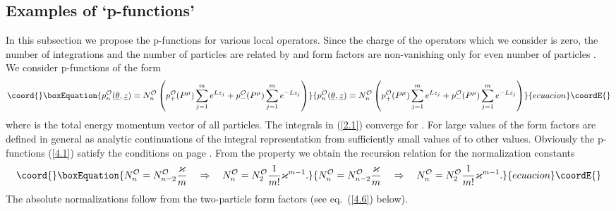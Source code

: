 \documentclass[a4paper,a4paper]{article}
\begin{document}
\subsection{Examples of `p-functions'}

\label{s41}

In this subsection we propose the p-functions for various local operators.
Since the charge of the operators which we consider is zero, the number of
integrations \coordHE{} and the number of particles \coordHE{} are related by \coordHE{} and
form factors are non-vanishing only for even number of particles \coordHE{}. We consider p-functions of the form 
\begin{equation}\coord{}\boxEquation{
p_{n}^{\mathcal{O}}(\underline{\theta },{\underline{z}})=N_{n}^{\mathcal{O}
}\left( p_{+}^{\mathcal{O}}(P^{\mu })\sum_{j=1}^{m}e^{Lz_{j}}+p_{-}^{
\mathcal{O}}(P^{\mu })\sum_{j=1}^{m}e^{-Lz_{j}}\right)  \label{4.1}
}{
p_{n}^{\mathcal{O}}(\underline{\theta },{\underline{z}})=N_{n}^{\mathcal{O}
}\left( p_{+}^{\mathcal{O}}(P^{\mu })\sum_{j=1}^{m}e^{Lz_{j}}+p_{-}^{
\mathcal{O}}(P^{\mu })\sum_{j=1}^{m}e^{-Lz_{j}}\right)  }{ecuacion}\coordE{}\end{equation}
where \coordHE{} is the total energy momentum vector of all particles. The
integrals in (\ref{2.1}) converge for \coordHE{}. For
large values of \coordHE{} the form factors are defined in general as analytic
continuations of the integral representation from sufficiently small values
of \myHighlight{$\nu $}\coordHE{} to other values. Obviously the p-functions (\ref{4.1}) satisfy the
conditions \coordHE{} on page \pageref{p}. From the
property \coordHE{} we obtain the recursion relation for the
normalization constants 
\begin{equation}\coord{}\boxEquation{
N_{n}^{\mathcal{O}}=N_{n-2}^{\mathcal{O}}\frac{\varkappa }{m}\quad
\Rightarrow \quad N_{n}^{\mathcal{O}}=N_{2}^{\mathcal{O}}\frac{1}{m!}
\varkappa ^{m-1}.  \label{4.2}
}{
N_{n}^{\mathcal{O}}=N_{n-2}^{\mathcal{O}}\frac{\varkappa }{m}\quad
\Rightarrow \quad N_{n}^{\mathcal{O}}=N_{2}^{\mathcal{O}}\frac{1}{m!}
\varkappa ^{m-1}.  }{ecuacion}\coordE{}\end{equation}
The absolute normalizations follow from the two-particle form factors (see
eq.~(\ref{4.6}) below).
\end{document}
